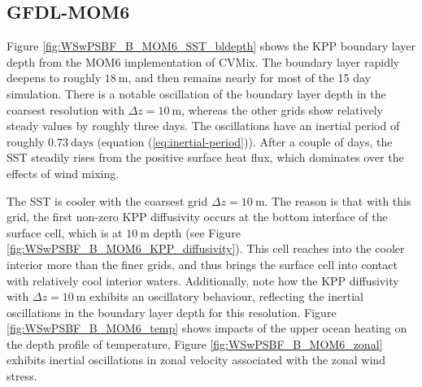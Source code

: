 \subsection{GFDL-MOM6} 

Figure \ref{fig:WSwPSBF_B_MOM6_SST_bldepth} shows the KPP boundary
layer depth from the MOM6 implementation of CVMix.  The boundary layer
rapidly deepens to roughly $18~\mbox{m}$, and then remains nearly for
most of the 15 day simulation.  There is a notable oscillation of the
boundary layer depth in the coarsest resolution with $\Delta z =
10~\mbox{m}$, whereas the other grids show relatively steady values by
roughly three days.  The oscillations have an inertial period of
roughly $0.73~\mbox{days}$ (equation (\ref{eq:inertial-period})).
After a couple of days, the SST steadily rises from the positive
surface heat flux, which dominates over the effects of wind mixing.

The SST is cooler with the coarsest grid $\Delta z = 10~\mbox{m}$.
The reason is that with this grid, the first non-zero KPP diffusivity
occurs at the bottom interface of the surface cell, which is at
$10~\mbox{m}$ depth (see Figure
\ref{fig:WSwPSBF_B_MOM6_KPP_diffusivity}).  This cell reaches into the
cooler interior more than the finer grids, and thus brings the surface
cell into contact with relatively cool interior waters.  Additionally,
note how the KPP diffusivity with $\Delta z = 10~\mbox{m}$ exhibits an
oscillatory behaviour, reflecting the inertial oscillations in the
boundary layer depth for this resolution.  Figure
\ref{fig:WSwPSBF_B_MOM6_temp} shows impacts of the upper ocean heating
on the depth profile of temperature, Figure
\ref{fig:WSwPSBF_B_MOM6_zonal} exhibits inertial oscillations in zonal
velocity associated with the zonal wind stress.

